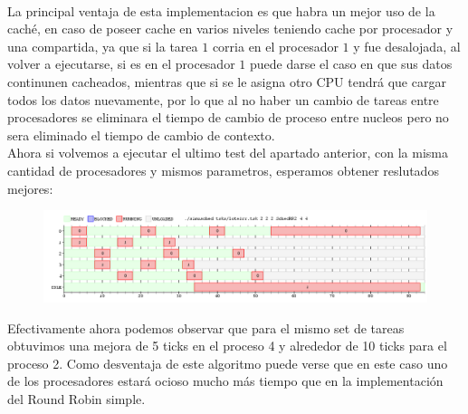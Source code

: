 \\
La principal ventaja de esta implementacion es que habra un mejor uso de la caché, en caso de poseer cache en varios niveles teniendo cache por procesador y una compartida, ya que si la tarea $1$ corria en el procesador $1$ y fue desalojada, al volver a ejecutarse, si es en el procesador $1$ puede darse el caso en que sus datos continunen cacheados, mientras que si se le asigna otro CPU tendrá que cargar todos los datos nuevamente, por lo que al no haber un cambio de tareas entre procesadores se eliminara el tiempo de cambio de proceso entre nucleos  pero no sera eliminado el tiempo de cambio de contexto.
\\
Ahora si volvemos a ejecutar el ultimo test del apartado anterior, con la misma cantidad de procesadores y mismos parametros, esperamos obtener reslutados mejores:
\\
\begin{figure}[H]
  \centering
\includegraphics[scale=0.45]{graficos/parte2/rr2/1.png}
  \caption[Caption for LOF]{}
\end{figure}
Efectivamente ahora podemos observar que para el mismo set de tareas obtuvimos una mejora de 5 ticks en el proceso 4 y alrededor de 10 ticks para el proceso 2. Como desventaja de este algoritmo puede verse que en este caso uno de los procesadores estará ocioso mucho más tiempo que en la implementación del Round Robin simple.
